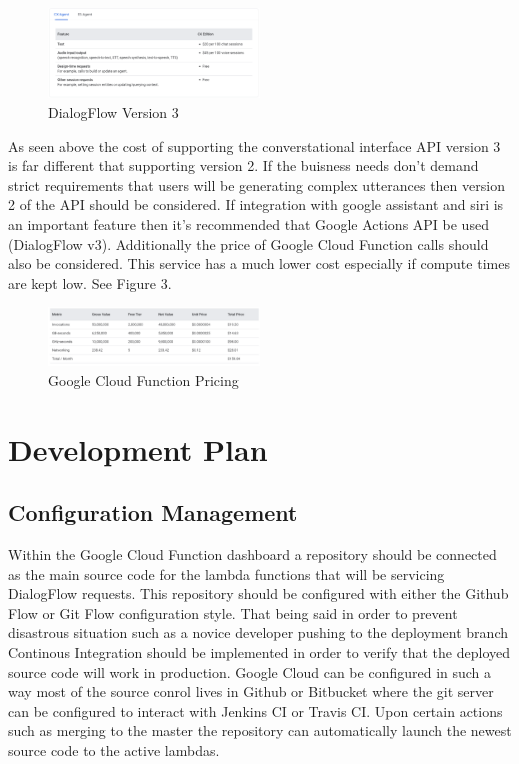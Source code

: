 \documentclass[9pt,software]{livecoms}
\begin{document}
\begin{figure}
  \caption{DialogFlow Version 3}
  \centering
    \includegraphics[width=0.5\textwidth]{CX_Agent.PNG}
\end{figure}

As seen above the cost of supporting the converstational interface API version 3 is far different that supporting version 2. If the buisness needs don't demand strict requirements 
that users will be generating complex utterances then version 2 of the API should be considered. If integration with google assistant and siri is an important feature then it's recommended
that Google Actions API be used (DialogFlow v3). Additionally the price of Google Cloud Function calls should also be considered. This service has a much lower cost especially if compute times
are kept low. See Figure 3.

\begin{figure}
  \caption{Google Cloud Function Pricing}
  \centering
    \includegraphics[width=0.5\textwidth]{GCloudFunction.PNG}
\end{figure}

\section{Development Plan}
\subsection{Configuration Management}
Within the Google Cloud Function dashboard a repository should be connected as the main source code for the lambda functions that will be servicing DialogFlow requests. This repository should be configured
with either the Github Flow or Git Flow configuration style. That being said in order to prevent disastrous situation such as a novice developer pushing to the deployment branch Continous Integration should
be implemented in order to verify that the deployed source code will work in production. Google Cloud can be configured in such a way most of the source conrol lives in Github or Bitbucket where the git server
can be configured to interact with Jenkins CI or Travis CI. Upon certain actions such as merging to the master the repository can automatically launch the newest source code
to the active lambdas.
\end{document}
